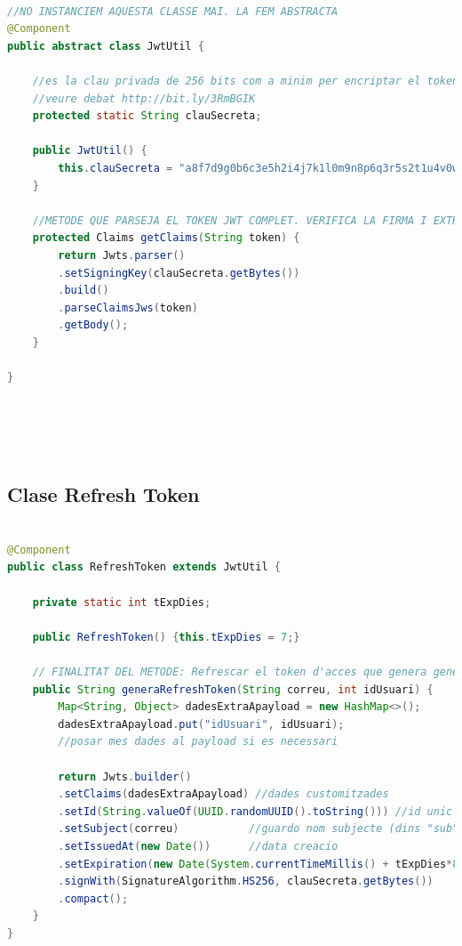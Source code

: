 \documentclass[a4paper,12pt]{report}
\begin{document}
\begin{lstlisting}[language=Java, basicstyle=\ttfamily\tiny, keywordstyle=\color{magenta}]
	
//NO INSTANCIEM AQUESTA CLASSE MAI. LA FEM ABSTRACTA
@Component
public abstract class JwtUtil {
	
	//es la clau privada de 256 bits com a minim per encriptar el token (tant el d'acces com el de refresh)
	//veure debat http://bit.ly/3RmBGIK
	protected static String clauSecreta;
	
	public JwtUtil() {
		this.clauSecreta = "a8f7d9g0b6c3e5h2i4j7k1l0m9n8p6q3r5s2t1u4v0w9x8y7z";
	}
	
	//METODE QUE PARSEJA EL TOKEN JWT COMPLET. VERIFICA LA FIRMA I EXTRAU LES CLAIMS (parells clau valor en el payload).
	protected Claims getClaims(String token) {
		return Jwts.parser()
		.setSigningKey(clauSecreta.getBytes())
		.build()
		.parseClaimsJws(token)
		.getBody();
	}
	
}






\end{lstlisting}


				

\subsection{Clase Refresh Token}

\begin{lstlisting}[language=Java, basicstyle=\ttfamily\tiny, keywordstyle=\color{magenta}]

@Component
public class RefreshToken extends JwtUtil {
	
	private static int tExpDies;
	
	public RefreshToken() {this.tExpDies = 7;}
	
	// FINALITAT DEL METODE: Refrescar el token d'acces que genera generaAccesToken().
	public String generaRefreshToken(String correu, int idUsuari) {
		Map<String, Object> dadesExtraApayload = new HashMap<>();
		dadesExtraApayload.put("idUsuari", idUsuari);
		//posar mes dades al payload si es necessari
		
		return Jwts.builder()
		.setClaims(dadesExtraApayload) //dades customitzades
		.setId(String.valueOf(UUID.randomUUID().toString())) //id unic per a token. Per traSSSabilitat
		.setSubject(correu)           //guardo nom subjecte (dins "sub")
		.setIssuedAt(new Date())      //data creacio
		.setExpiration(new Date(System.currentTimeMillis() + tExpDies*86400*1000))  //expiracio
		.signWith(SignatureAlgorithm.HS256, clauSecreta.getBytes())
		.compact();
	}
}

\end{lstlisting}
\end{document}
